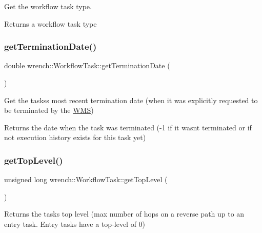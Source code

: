Get the workflow task type. 

\begin{DoxyReturn}{Returns}
a workflow task type 
\end{DoxyReturn}
\mbox{\label{classwrench_1_1_workflow_task_a864c86e8bb6de6ab16106169ec0a2cc2}} 
\subsubsection{\texorpdfstring{get\+Termination\+Date()}{getTerminationDate()}}
{\footnotesize\ttfamily double wrench\+::\+Workflow\+Task\+::get\+Termination\+Date (\begin{DoxyParamCaption}{ }\end{DoxyParamCaption})}



Get the tasks\textquotesingle{}s most recent termination date (when it was explicitly requested to be terminated by the \hyperlink{classwrench_1_1_w_m_s}{W\+MS}) 

\begin{DoxyReturn}{Returns}
the date when the task was terminated (-\/1 if it wasn\textquotesingle{}t terminated or if not execution history exists for this task yet) 
\end{DoxyReturn}
\mbox{\label{classwrench_1_1_workflow_task_a07fd9a09e51649fe32aedd22166b1047}} 
\subsubsection{\texorpdfstring{get\+Top\+Level()}{getTopLevel()}}
{\footnotesize\ttfamily unsigned long wrench\+::\+Workflow\+Task\+::get\+Top\+Level (\begin{DoxyParamCaption}{ }\end{DoxyParamCaption})}



Returns the task\textquotesingle{}s top level (max number of hops on a reverse path up to an entry task. Entry tasks have a top-\/level of 0) 

